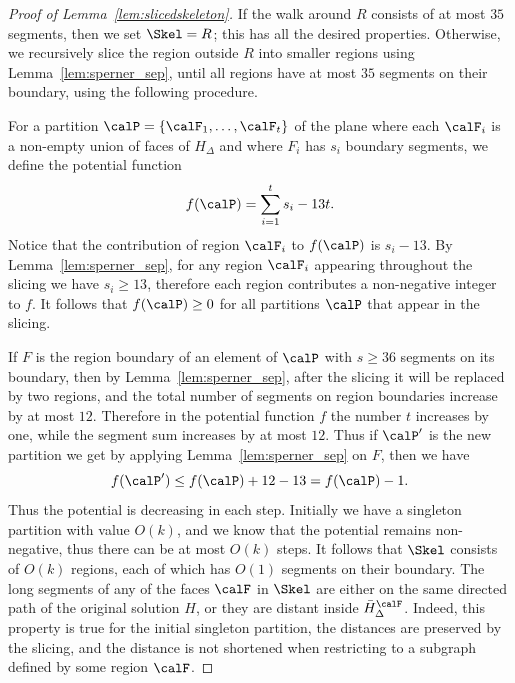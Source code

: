 \begin{proof}[Proof of Lemma~\ref{lem:slicedskeleton}]
If the walk around $R$ consists of at most $35$ segments, then we set $\Skel=R$; this has all the desired properties. Otherwise, we recursively slice the region outside $R$ into smaller regions using Lemma~\ref{lem:sperner_sep}, until all regions have at most $35$ segments on their boundary, using the following procedure. 

For a partition $\calP=\{\calF_1,\dots,\calF_t\}$ of the plane where each $\calF_i$ is a non-empty union of faces of $H_\Delta$ and where $F_i$ has $s_i$ boundary segments, we define the potential function \[f(\calP)=\sum_{i=1}^t s_i -13t.\]
Notice that the contribution of region $\calF_i$ to $f(\calP)$ is $s_i-13$. By Lemma~\ref{lem:sperner_sep}, for any region $\calF_i$ appearing throughout the slicing we have $s_i\geq 13$, therefore each region contributes a non-negative integer to $f$. It follows that $f(\calP)\geq 0$ for all partitions $\calP$ that appear in the slicing.

If $F$ is the region boundary of an element of $\calP$ with $s\geq 36$ segments on its boundary, then by Lemma~\ref{lem:sperner_sep}, after the slicing it will be replaced by two regions, and the total number of segments on region boundaries increase by at most $12$. Therefore in the potential function $f$ the number $t$ increases by one, while the segment sum increases by at most $12$. Thus if $\calP'$ is the new partition we get by applying Lemma~\ref{lem:sperner_sep} on $F$, then we have
\[f(\calP')\leq f(\calP)+12-13 = f(\calP)-1.\]
Thus the potential is decreasing in each step. Initially we have a singleton partition with value $O(k)$, and we know that the potential remains non-negative, thus there can be at most $O(k)$ steps. It follows that $\Skel$ consists of $O(k)$ regions, each of which has $O(1)$ segments on their boundary. The long segments of any of the faces $\calF$ in $\Skel$ are either on the same directed path of the original solution $H$, or they are distant inside $\bar{H}^\calF_\Delta$. Indeed, this property is true for the initial singleton partition, the distances are preserved by the slicing, and the distance is not shortened when restricting to a subgraph defined by some region $\calF$.
\end{proof}